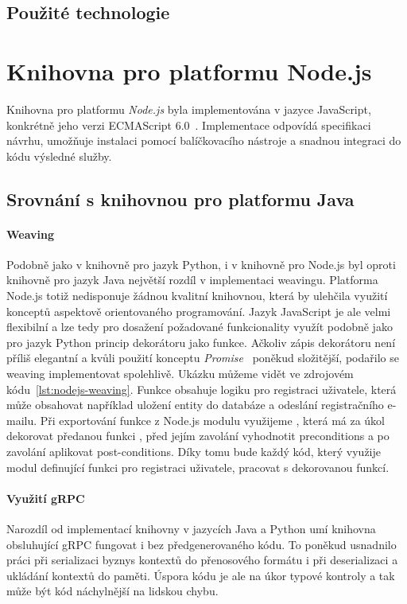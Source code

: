 \subsection{Použité technologie}

\section{Knihovna pro platformu Node.js}

Knihovna pro platformu \textit{Node.js} byla implementována
v jazyce JavaScript, konkrétně jeho verzi
ECMAScript 6.0~\cite{ecma60}.
Implementace odpovídá specifikaci návrhu, umožňuje
instalaci pomocí balíčkovacího nástroje a snadnou
integraci do kódu výsledné služby.

\subsection{Srovnání s knihovnou pro platformu Java}

\paragraph{Weaving} Podobně jako v knihovně pro jazyk Python,
i v knihovně pro Node.js byl oproti knihovně pro jazyk Java
největší rozdíl v implementaci weavingu. Platforma Node.js
totiž nedisponuje žádnou kvalitní knihovnou, která by ulehčila
využití konceptů aspektově orientovaného programování.
Jazyk JavaScript je ale velmi flexibilní a lze
tedy pro dosažení požadované funkcionality využít
podobně jako pro jazyk Python princip dekorátoru jako funkce.
Ačkoliv zápis dekorátoru není příliš elegantní a kvůli
použití konceptu \textit{Promise}~\cite{kambona2013evaluation}
poněkud složitější, podařilo se weaving implementovat spolehlivě.
Ukázku můžeme vidět ve zdrojovém kódu~\ref{lst:nodejs-weaving}.
Funkce  obsahuje logiku pro registraci uživatele,
která může obsahovat například uložení entity do databáze a odeslání
registračního e-mailu. Při exportování funkce z Node.js modulu
využijeme , která má za úkol dekorovat
předanou funkci , před jejím zavolání vyhodnotit
preconditions a po zavolání aplikovat post-conditions.
Díky tomu bude každý kód, který využije modul definující funkci
pro registraci uživatele, pracovat s dekorovanou funkcí.

\paragraph{Využití gRPC} Narozdíl od implementací knihovny
v jazycích Java a Python umí knihovna obsluhující gRPC
fungovat i bez předgenerovaného kódu. To poněkud usnadnilo
práci při serializaci byznys kontextů do přenosového formátu
i při deserializaci a ukládání kontextů do paměti. Úspora
kódu je ale na úkor typové kontroly a tak může být kód náchylnější
na lidskou chybu.

